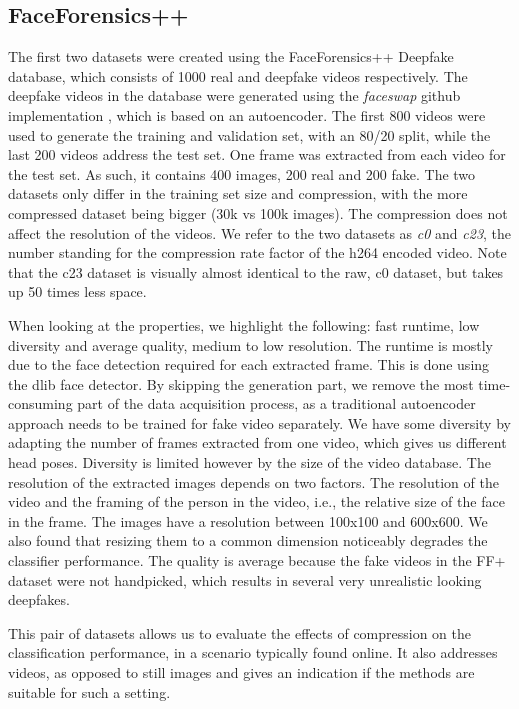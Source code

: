 \documentclass[11pt]{article}
\begin{document}
\subsection{FaceForensics++}

The first two datasets were created using the FaceForensics++ Deepfake database, which consists of 1000 real and deepfake videos respectively. The deepfake videos in the database were generated using the \emph{faceswap} github implementation \cite{swap}, which is based on an autoencoder. The first 800 videos were used to generate the training and validation set, with an 80/20 split, while the last 200 videos address the test set. One frame was extracted from each video for the test set. As such, it contains 400 images, 200 real and 200 fake. The two datasets only differ in the training set size and compression, with the more compressed dataset being bigger (30k vs 100k images). The compression does not affect the resolution of the videos. We refer to the two datasets as \emph{c0} and \emph{c23}, the number standing for the compression rate factor of the h264 encoded video. Note that the c23 dataset is visually almost identical to the raw, c0 dataset, but takes up 50 times less space.

When looking at the properties, we highlight the following: fast runtime, low diversity and average quality, medium to low resolution. The runtime is mostly due to the face detection required for each extracted frame. This is done using the dlib \cite{dlib09} face detector. By skipping the generation part, we remove the most time-consuming part of the data acquisition process, as a traditional autoencoder approach needs to be trained for fake video separately. We have some diversity by adapting the number of frames extracted from one video, which gives us different head poses. Diversity is limited however by the size of the video database. The resolution of the extracted images depends on two factors. The resolution of the video and the framing of the person in the video, i.e., the relative size of the face in the frame. The images have a resolution between 100x100 and 600x600. We also found that resizing them to a common dimension noticeably degrades the classifier performance. The quality is average because the fake videos in the FF+ dataset were not handpicked, which results in several very unrealistic looking deepfakes.

This pair of datasets allows us to evaluate the effects of compression on the classification performance, in a scenario typically found online. It also addresses videos, as opposed to still images and gives an indication if the methods are suitable for such a setting.
\end{document}
